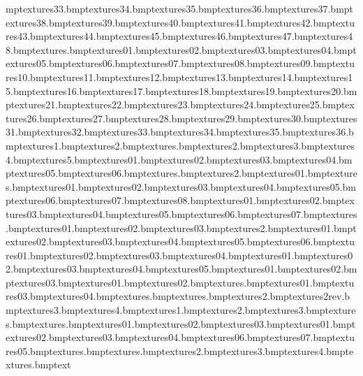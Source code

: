 mp textures\sharprock33.bmp textures\sharprock34.bmp textures\sharprock35.bmp textures\sharprock36.bmp textures\sharprock37.bmp textures\sharprock38.bmp textures\sharprock39.bmp textures\sharprock40.bmp textures\sharprock41.bmp textures\sharprock42.bmp textures\sharprock43.bmp textures\sharprock44.bmp textures\sharprock45.bmp textures\sharprock46.bmp textures\sharprock47.bmp textures\sharprock48.bmp textures\sign.bmp textures\sign01.bmp textures\sign02.bmp textures\sign03.bmp textures\sign04.bmp textures\sign05.bmp textures\sign06.bmp textures\sign07.bmp textures\sign08.bmp textures\sign09.bmp textures\sign10.bmp textures\sign11.bmp textures\sign12.bmp textures\sign13.bmp textures\sign14.bmp textures\sign15.bmp textures\sign16.bmp textures\sign17.bmp textures\sign18.bmp textures\sign19.bmp textures\sign20.bmp textures\sign21.bmp textures\sign22.bmp textures\sign23.bmp textures\sign24.bmp textures\sign25.bmp textures\sign26.bmp textures\sign27.bmp textures\sign28.bmp textures\sign29.bmp textures\sign30.bmp textures\sign31.bmp textures\sign32.bmp textures\sign33.bmp textures\sign34.bmp textures\sign35.bmp textures\sign36.bmp textures\simplewall1.bmp textures\simplewall2.bmp textures\simplewallextra.bmp textures\simplewallextra2.bmp textures\simplewallextra3.bmp textures\simplewallextra4.bmp textures\simplewallextra5.bmp textures\slide01.bmp textures\slide02.bmp textures\slide03.bmp textures\slide04.bmp textures\slide05.bmp textures\slide06.bmp textures\snow.bmp textures\snow2.bmp textures\snowbarber01.bmp textures\snowblanket.bmp textures\snowdecal01.bmp textures\snowdecal02.bmp textures\snowdecal03.bmp textures\snowdecal04.bmp textures\snowdecal05.bmp textures\snowdecal06.bmp textures\snowdecal07.bmp textures\snowdecal08.bmp textures\snowplank01.bmp textures\snowplank02.bmp textures\snowplank03.bmp textures\snowplank04.bmp textures\snowplank05.bmp textures\snowplank06.bmp textures\snowplank07.bmp textures\snowpole.bmp textures\snowpole01.bmp textures\snowpole02.bmp textures\snowpole03.bmp textures\snowpole2.bmp textures\snowtograss01.bmp textures\snowtograss02.bmp textures\snowtograss03.bmp textures\snowtograss04.bmp textures\snowtograss05.bmp textures\snowtograss06.bmp textures\snowtograsscorner01.bmp textures\snowtograsscorner02.bmp textures\snowtograsscorner03.bmp textures\snowtograsscorner04.bmp textures\snowtopath01.bmp textures\snowtopath02.bmp textures\snowtopath03.bmp textures\snowtopath04.bmp textures\snowtopath05.bmp textures\snowtopathcorner01.bmp textures\snowtopathcorner02.bmp textures\snowtopathcorner03.bmp textures\snowtopathdecal01.bmp textures\snowtopathdecal02.bmp textures\snowtree.bmp textures\snowtree01.bmp textures\snowtree03.bmp textures\snowtree04.bmp textures\strawfloor.bmp textures\tazsign.bmp textures\tazsign2.bmp textures\tazsign2rev.bmp textures\tazsign3.bmp textures\tazsign4.bmp textures\templevines1.bmp textures\templevines2.bmp textures\templevines3.bmp textures\test.bmp textures\torch.bmp textures\torpedo01.bmp textures\torpedo02.bmp textures\torpedo03.bmp textures\trash01.bmp textures\trash02.bmp textures\trash03.bmp textures\trash04.bmp textures\trash06.bmp textures\trash07.bmp textures\trashcan05.bmp textures\treeend.bmp textures\treeleave.bmp textures\treeleave2.bmp textures\treeleave3.bmp textures\treeleave4.bmp textures\treeplanks.bmp text